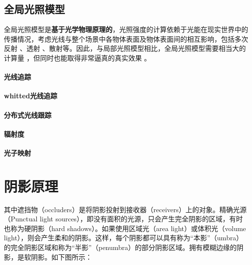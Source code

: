 \documentclass[UTF8,a4paper,12pt]{ctexbook}
\begin{document}
		\subsection{全局光照模型}
			全局光照模型是\textbf{基于光学物理原理的}，光照强度的计算依赖于光能在现实世界中的传播情况，考虑光线与整个场景中各物体表面及物体表面间的相互影响，包括多次反射 、透射 、散射等。因此，与局部光照模型相比，全局光照模型需要相当大的计算量 ，但同时也能取得非常逼真的真实效果 。
		
			
			\paragraph{光线追踪}
			
			\paragraph{whitted光线追踪}
			
			\paragraph{分布式光线跟踪}
			
			\paragraph{辐射度}
			
			\paragraph{光子映射}
			
	\section{阴影原理}
	
		其中遮挡物（occluders）是将阴影投射到接收器（receivers）上的对象。精确光源（Punctual light sources），即没有面积的光源，只会产生完全阴影的区域，有时也称为硬阴影（hard shadows）。如果使用区域光（area light）或体积光（volume light），则会产生柔和的阴影。这样，每个阴影都可以具有称为“本影”（umbra）的完全阴影区域和称为“半影”（penumbra）的部分阴影区域。拥有模糊边缘的阴影，是软阴影。如下图所示：
	
\end{document}

